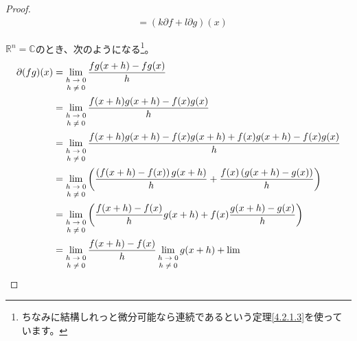 \documentclass[dvipdfmx]{jsarticle}
\begin{document}
\begin{proof}
\begin{align*}
&= (k\partial f + l\partial g)(x)
\end{align*}\par
$\mathbb{R}^{n} = \mathbb{C}$のとき、次のようになる\footnote{ちなみに結構しれっと微分可能なら連続であるという定理\ref{4.2.1.3}を使っています。}。
\begin{align*}
\partial(fg)(x) &= \lim_{\scriptsize \begin{matrix}
h \rightarrow 0 \\
h \neq 0 \\
\end{matrix}}\frac{fg(x + h) - fg(x)}{h}\\
&= \lim_{\scriptsize \begin{matrix}
h \rightarrow 0 \\
h \neq 0 \\
\end{matrix}}\frac{f(x + h)g(x + h) - f(x)g(x)}{h}\\
&= \lim_{\scriptsize \begin{matrix}
h \rightarrow 0 \\
h \neq 0 \\
\end{matrix}}\frac{f(x + h)g(x + h) - f(x)g(x + h) + f(x)g(x + h) - f(x)g(x)}{h}\\
&= \lim_{\scriptsize \begin{matrix}
h \rightarrow 0 \\
h \neq 0 \\
\end{matrix}}\left( \frac{\left( f(x + h) - f(x) \right)g(x + h)}{h} + \frac{f(x)\left( g(x + h) - g(x) \right)}{h} \right)\\
&= \lim_{\scriptsize \begin{matrix}
h \rightarrow 0 \\
h \neq 0 \\
\end{matrix}}\left( \frac{f(x + h) - f(x)}{h}g(x + h) + f(x)\frac{g(x + h) - g(x)}{h} \right)\\
&= \lim_{\scriptsize \begin{matrix}
h \rightarrow 0 \\
h \neq 0 \\
\end{matrix}}\frac{f(x + h) - f(x)}{h}\lim_{\scriptsize \begin{matrix}
h \rightarrow 0 \\
h \neq 0 \\
\end{matrix}}{g(x + h)} + \lim_{\scriptsize \begin{matrix}

\end{matrix}}
\end{align*}
\end{proof}
\end{document}
